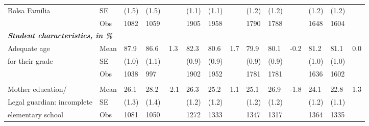 \documentclass[
	article,			%
	12pt,				%
	oneside,			%
	a4paper,			%
	]{article}
\begin{document}
\begin{table}[h!]
\begin{tabular}{lp{2.335em}p{1.665em}p{1.665em}cp{1.665em}p{1.665em}cp{1.665em}p{1.665em}cp{1.665em}p{1.665em}c}
Bolsa Família &         SE &      (1.5) &      (1.5) &            &      (1.1) &      (1.1) &            &      (1.2) &      (1.2) &            &      (1.2) &      (1.2) &            \\

           &        Obs &       1082 &       1059 &            &       1905 &       1958 &            &       1790 &       1788 &            &       1648 &       1604 &            \\
\hline
                                                                                                                   \multicolumn{ 14}{l}{{\it {\bf Student characteristics, in \%}}} \\

Adequate age &       Mean &       87.9 &       86.6 &        1.3 &       82.3 &       80.6 &        1.7 &       79.9 &       80.1 &       -0.2 &       81.2 &       81.1 &        0.0 \\

for their grade &         SE &      (1.0) &      (1.1) &            &      (0.9) &      (0.9) &            &      (0.9) &      (0.9) &            &      (1.0) &      (1.0) &            \\

           &        Obs &       1038 &        997 &            &       1902 &       1952 &            &       1781 &       1781 &            &       1636 &       1602 &            \\

           &            &            &            &            &            &            &            &            &            &            &            &            &            \\

Mother education/ &       Mean &       26.1 &       28.2 &       -2.1 &       26.3 &       25.2 &        1.1 &       25.1 &       26.9 &       -1.8 &       24.1 &       22.8 &        1.3 \\

 Legal guardian: incomplete &         SE &      (1.3) &      (1.4) &            &      (1.2) &      (1.2) &            &      (1.2) &      (1.2) &            &      (1.2) &      (1.1) &            \\

 elementary school &        Obs &       1081 &       1050 &            &       1272 &       1333 &            &       1347 &       1317 &            &       1364 &       1335 &            \\


\end{tabular}
\end{table}
\end{document}
